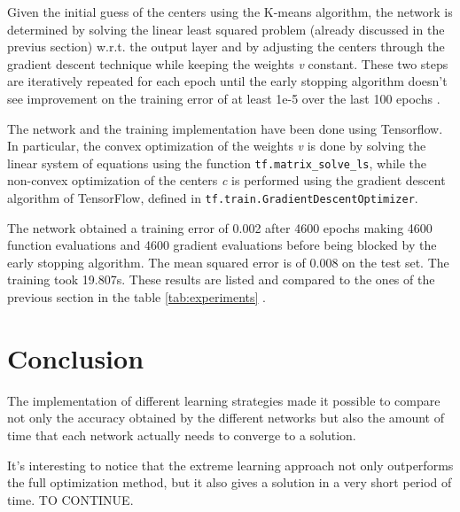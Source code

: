 \documentclass[a4paper]{article}
\numberwithin{equation}{section} %
\numberwithin{figure}{section} %
\numberwithin{table}{section} %
\theoremstyle{definition}
\begin{document}
Given the initial guess of the centers using the K-means algorithm,
the network is determined by solving the linear least squared problem
(already discussed in the previus section) w.r.t. the output layer and by
adjusting the centers through the gradient descent technique while keeping the
weights \textit{v} constant.
These two steps are iteratively repeated for each epoch until the early
stopping algorithm doesn't see improvement on the training error of at least
1e-5 over the last 100 epochs .

The network and the training implementation have been done using Tensorflow.
In particular, the convex optimization of the weights
\textit{v} is done by solving the linear system of equations using the function
\texttt{tf.matrix\_solve\_ls}, while the non-convex optimization of the centers
\textit{c} is performed using the gradient descent algorithm of TensorFlow,
defined in \texttt{tf.train.GradientDescentOptimizer}.

The network obtained a training error of 0.002 after 4600 epochs making
4600 function evaluations and 4600 gradient evaluations before being
blocked by the early stopping algorithm.
The mean squared error is of 0.008 on the test set. The training took 19.807s.
These results are listed and compared to the ones of the previous section in the table \ref{tab:experiments} .


\section{Conclusion}

The implementation of different learning strategies made it possible to
compare not only the accuracy obtained by the different networks but also the
amount of time that each network actually needs to converge to a solution.

It's interesting to notice that the extreme learning approach not only
outperforms the full optimization method, but it also gives a solution
in a very short period of time. TO CONTINUE.
\end{document}
